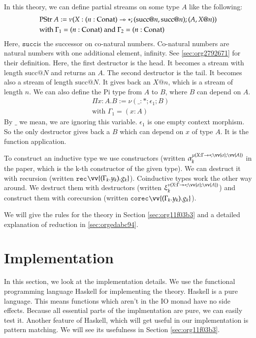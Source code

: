 \documentclass[a4paper,cleardoubleempty,BCOR1cm]{scrbook}
\begin{document}
In this theory, we can define partial streams on some type \(A\) like the following:
\begin{align*}
&\text{PStr }A := \nu(X:(n:\text{Conat})\rightarrowtriangle*;(\text{succ} @ n, \text{succ} @ n);(A, X @ n))\\
&\text{with } \Gamma_1 = (n:\text{Conat}) \text{ and } \Gamma_2 = (n:\text{Conat})
\end{align*}
Here, $\mathtt{succ}$\;is the successor on co-natural numbers.  Co-natural numbers are
natural numbers with one additional element, infinity. See \ref{sec:org2792671}
for their definition. Here, the first destructor is the head. It becomes a
stream with length \(\text{succ} @ N\) and returns an \(A\). The second destructor
is the tail. It becomes also a stream of length \(\text{succ} @ N\). It gives
back an \(X @ n\), which is a stream of length \(n\). We can also define the Pi
type from \(A\) to \(B\), where \(B\) can depend on \(A\).
\begin{align*}
&\Pi x:A.B := \nu(\_:*;\epsilon_1;B)\\
&\text{with } \Gamma_1 = (x:A)
\end{align*}
By \(\_\) we mean, we are ignoring this variable. \(\epsilon_1\) is one empty
context morphism.  So the only destructor gives back a \(B\) which can depend
on \(x\) of type \(A\).  It is the function application.

To construct an inductive type we use constructors (written
\(\alpha_k^{\mu(X:\Gamma\rat*;\vv{\sigma};\vv{A})}\) in the paper, which is the k-th
constructor of the given type).  We can destruct it with recursion (written
$\mathtt{rec}$\;\(\vv{(\Gamma_k.y_k).g_k}\)).  Coinductive types work the other way around.
We destruct them with destructors (written
\(\xi_k^{\nu(X:\Gamma\rat*;\vv{\sigma};\vv{A})}\)) and construct them with
corecursion (written $\mathtt{corec}$\;\(\vv{(\Gamma_k.y_k).g_k}\)).

We will give the rules for the theory in Section \ref{sec:org11f03b3} and a detailed
explanation of reduction in \ref{sec:orgedabc94}.

\chapter{Implementation}
\label{sec:org312ed67}
In this section, we look at the implementation details. We use the functional
programming language Haskell for implementing the theory. Haskell is a pure
language. This means functions which aren't in the IO monad have no side
effects. Because all essential parts of the implmentation are pure, we can
easily test it. Another feature of Haskell, which will get useful in our
implementation is pattern matching. We will see its usefulness in Section
\ref{sec:org11f03b3}.
\end{document}

